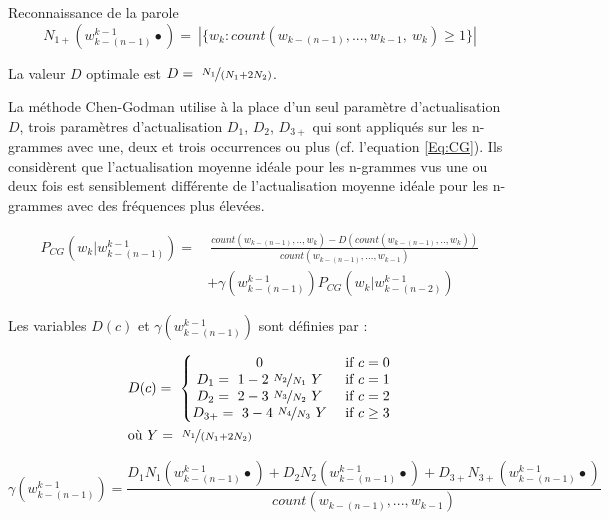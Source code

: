 \documentclass{style/these}
\begin{document}
\begin{part}{Reconnaissance de la parole}
\begin{equation}
N_{1+}\left(w_{k-(n-1)}^{k-1}\bullet\right) = \ |\{w_k : count(w_{k-(n-1)},...,w_{k-1},\ w_k) \geq 1\}|
\label{Eq:N1}
\end{equation}

La valeur $D$ optimale est $D = \ \nicefrac{N_1}{(N_1 + 2N_2)}$.

La méthode Chen-Godman utilise à la place d'un seul paramètre d'actualisation $D$, trois paramètres d'actualisation $D_1$, $D_2$, $D_{3+}$ qui sont appliqués sur les n-grammes avec une, deux et trois occurrences ou plus (cf. l'equation \ref{Eq:CG}). Ils considèrent que l'actualisation moyenne idéale pour les n-grammes vus une ou deux fois est sensiblement différente de l'actualisation moyenne idéale pour les n-grammes avec des fréquences plus élevées.

\begin{equation}
\begin{split}
	P_{CG} \left(w_k|w_{k-(n-1)}^{k-1}\right) = &\ \frac{count(w_{k-(n-1)},..,w_{k}) - D(count(w_{k-(n-1)},..,w_{k}))}{count(w_{k-(n-1)},...,w_{k-1})} \\
	& + \gamma\left(w_{k-(n-1)}^{k-1}\right) P_{CG}\left(w_k|w_{k-(n-2)}^{k-1}\right)
\end{split}
\label{Eq:CG}
\end{equation}

Les variables $D(c)$ et $\gamma\left(w_{k-(n-1)}^{k-1}\right)$ sont définies par : 

\begin{equation*}
\begin{split}
& D(c) =\  \left\{
	\begin{matrix}
	0 									& \text{ if } c = 0 \\
	D_1 =\ 1 - 2\  \nicefrac{N_2}{N_1}\ Y	& \text{ if } c = 1 \\
	D_2 =\ 2 - 3\ \nicefrac{N_3}{N_2}\ Y		& \text{ if } c = 2 \\
	D_{3+} = \ 3 - 4\ \nicefrac{N_4}{N_3}\ Y 	& \text{ if } c \geq 3 \\
	\end{matrix}\right. \\
& \text{où } Y = \   \nicefrac{N_1}{(N_1+2N_2)} 
\end{split}
\label{Eq:CG1}
\end{equation*}

\begin{equation*}
\gamma(w_{k-(n-1)}^{k-1}) = \frac{D_1N_1\left(w_{k-(n-1)}^{k-1}\bullet\right) + D_2N_2\left(w_{k-(n-1)}^{k-1}\bullet\right) + D_{3+}N_{3+}\left(w_{k-(n-1)}^{k-1}\bullet\right)}{count(w_{k-(n-1)},...,w_{k-1})}
\label{Eq:CG2}
\end{equation*}


\end{part}
\end{document}
